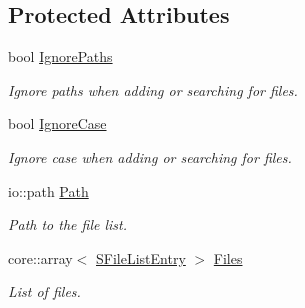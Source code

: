 \subsection*{Protected Attributes}
\begin{DoxyCompactItemize}
\item 
\hypertarget{classirr_1_1io_1_1_c_file_list_adeea3964498194a278e775a5f97c2350}{bool \hyperlink{classirr_1_1io_1_1_c_file_list_adeea3964498194a278e775a5f97c2350}{Ignore\-Paths}}\label{classirr_1_1io_1_1_c_file_list_adeea3964498194a278e775a5f97c2350}

\begin{DoxyCompactList}\small\item\em Ignore paths when adding or searching for files. \end{DoxyCompactList}\item 
\hypertarget{classirr_1_1io_1_1_c_file_list_a1650c352df0449712f00ca27f169e1cf}{bool \hyperlink{classirr_1_1io_1_1_c_file_list_a1650c352df0449712f00ca27f169e1cf}{Ignore\-Case}}\label{classirr_1_1io_1_1_c_file_list_a1650c352df0449712f00ca27f169e1cf}

\begin{DoxyCompactList}\small\item\em Ignore case when adding or searching for files. \end{DoxyCompactList}\item 
\hypertarget{classirr_1_1io_1_1_c_file_list_a23ac046d24e0fe04c6286c2347ea396a}{io\-::path \hyperlink{classirr_1_1io_1_1_c_file_list_a23ac046d24e0fe04c6286c2347ea396a}{Path}}\label{classirr_1_1io_1_1_c_file_list_a23ac046d24e0fe04c6286c2347ea396a}

\begin{DoxyCompactList}\small\item\em Path to the file list. \end{DoxyCompactList}\item 
\hypertarget{classirr_1_1io_1_1_c_file_list_a2666a2d090db3053a42229b4ef2c0264}{core\-::array$<$ \hyperlink{structirr_1_1io_1_1_s_file_list_entry}{S\-File\-List\-Entry} $>$ \hyperlink{classirr_1_1io_1_1_c_file_list_a2666a2d090db3053a42229b4ef2c0264}{Files}}\label{classirr_1_1io_1_1_c_file_list_a2666a2d090db3053a42229b4ef2c0264}

\begin{DoxyCompactList}\small\item\em List of files. \end{DoxyCompactList}\end{DoxyCompactItemize}



